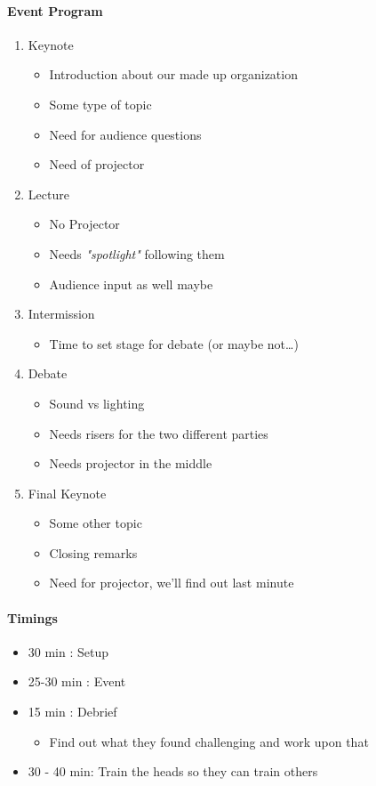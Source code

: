 \paragraph{Event Program}
\begin{enumerate}
    \item Keynote 
    \begin{itemize}
        \item Introduction about our made up organization 
        \item Some type of topic 
        \item Need for audience questions 
        \item Need of projector 
    \end{itemize}
    \item Lecture 
    \begin{itemize}
        \item No Projector 
        \item Needs \textit{"spotlight"} following them 
        \item Audience input as well maybe 
    \end{itemize}
    \item Intermission 
    \begin{itemize}
        \item Time to set stage for debate (or maybe not\dots)
    \end{itemize}
    \item Debate 
    \begin{itemize}
        \item Sound vs lighting 
        \item Needs risers for the two different parties 
        \item Needs projector in the middle
    \end{itemize}
    \item Final Keynote 
    \begin{itemize}
        \item Some other topic 
        \item Closing remarks 
        \item Need for projector, we'll find out last minute 
    \end{itemize}
\end{enumerate}

\paragraph{Timings}
\begin{itemize}
    \item 30 min : Setup 
    \item 25-30 min : Event 
    \item 15 min : Debrief 
    \begin{itemize}
        \item Find out what they found challenging and work upon that 
    \end{itemize}
    \item 30 - 40 min: Train the heads so they can train others 
\end{itemize}
